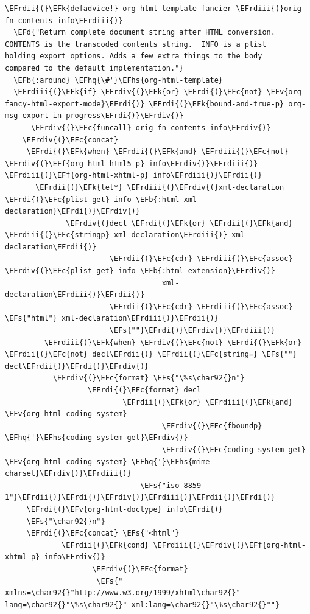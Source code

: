 \documentclass{scrartcl}
\newcommand{\EFk}[1]{\textcolor{EFk}{#1}} %
\newcommand{\EFd}[1]{\textcolor{EFd}{#1}} %
\newcommand{\EFs}[1]{\textcolor{EFs}{#1}} %
\newcommand{\EFb}[1]{\textcolor{EFb}{#1}} %
\newcommand{\EFc}[1]{\textcolor{EFc}{#1}} %
\newcommand{\EFv}[1]{\textcolor{EFv}{#1}} %
\newcommand{\EFf}[1]{\textcolor{EFf}{#1}} %
\newcommand{\EFhq}[1]{#1} %
\newcommand{\EFhs}[1]{#1} %
\newcommand{\EFrdi}[1]{#1} %
\newcommand{\EFrdii}[1]{#1} %
\newcommand{\EFrdiii}[1]{#1} %
\newcommand{\EFrdiv}[1]{#1} %
\begin{document}
\begin{Code}
\begin{Verbatim}[]
\EFrdii{(}\EFk{defadvice!} org-html-template-fancier \EFrdiii{(}orig-fn contents info\EFrdiii{)}
  \EFd{"Return complete document string after HTML conversion.
CONTENTS is the transcoded contents string.  INFO is a plist
holding export options. Adds a few extra things to the body
compared to the default implementation."}
  \EFb{:around} \EFhq{\#'}\EFhs{org-html-template}
  \EFrdiii{(}\EFk{if} \EFrdiv{(}\EFk{or} \EFrdi{(}\EFc{not} \EFv{org-fancy-html-export-mode}\EFrdi{)} \EFrdi{(}\EFk{bound-and-true-p} org-msg-export-in-progress\EFrdi{)}\EFrdiv{)}
      \EFrdiv{(}\EFc{funcall} orig-fn contents info\EFrdiv{)}
    \EFrdiv{(}\EFc{concat}
     \EFrdi{(}\EFk{when} \EFrdii{(}\EFk{and} \EFrdiii{(}\EFc{not} \EFrdiv{(}\EFf{org-html-html5-p} info\EFrdiv{)}\EFrdiii{)} \EFrdiii{(}\EFf{org-html-xhtml-p} info\EFrdiii{)}\EFrdii{)}
       \EFrdii{(}\EFk{let*} \EFrdiii{(}\EFrdiv{(}xml-declaration \EFrdi{(}\EFc{plist-get} info \EFb{:html-xml-declaration}\EFrdi{)}\EFrdiv{)}
              \EFrdiv{(}decl \EFrdi{(}\EFk{or} \EFrdii{(}\EFk{and} \EFrdiii{(}\EFc{stringp} xml-declaration\EFrdiii{)} xml-declaration\EFrdii{)}
                        \EFrdii{(}\EFc{cdr} \EFrdiii{(}\EFc{assoc} \EFrdiv{(}\EFc{plist-get} info \EFb{:html-extension}\EFrdiv{)}
                                    xml-declaration\EFrdiii{)}\EFrdii{)}
                        \EFrdii{(}\EFc{cdr} \EFrdiii{(}\EFc{assoc} \EFs{"html"} xml-declaration\EFrdiii{)}\EFrdii{)}
                        \EFs{""}\EFrdi{)}\EFrdiv{)}\EFrdiii{)}
         \EFrdiii{(}\EFk{when} \EFrdiv{(}\EFc{not} \EFrdi{(}\EFk{or} \EFrdii{(}\EFc{not} decl\EFrdii{)} \EFrdii{(}\EFc{string=} \EFs{""} decl\EFrdii{)}\EFrdi{)}\EFrdiv{)}
           \EFrdiv{(}\EFc{format} \EFs{"\%s\char92{}n"}
                   \EFrdi{(}\EFc{format} decl
                           \EFrdii{(}\EFk{or} \EFrdiii{(}\EFk{and} \EFv{org-html-coding-system}
                                    \EFrdiv{(}\EFc{fboundp} \EFhq{'}\EFhs{coding-system-get}\EFrdiv{)}
                                    \EFrdiv{(}\EFc{coding-system-get} \EFv{org-html-coding-system} \EFhq{'}\EFhs{mime-charset}\EFrdiv{)}\EFrdiii{)}
                               \EFs{"iso-8859-1"}\EFrdii{)}\EFrdi{)}\EFrdiv{)}\EFrdiii{)}\EFrdii{)}\EFrdi{)}
     \EFrdi{(}\EFv{org-html-doctype} info\EFrdi{)}
     \EFs{"\char92{}n"}
     \EFrdi{(}\EFc{concat} \EFs{"<html"}
             \EFrdii{(}\EFk{cond} \EFrdiii{(}\EFrdiv{(}\EFf{org-html-xhtml-p} info\EFrdiv{)}
                    \EFrdiv{(}\EFc{format}
                     \EFs{" xmlns=\char92{}"http://www.w3.org/1999/xhtml\char92{}" lang=\char92{}"\%s\char92{}" xml:lang=\char92{}"\%s\char92{}""}

\end{Verbatim}
\end{Code}
\end{document}
